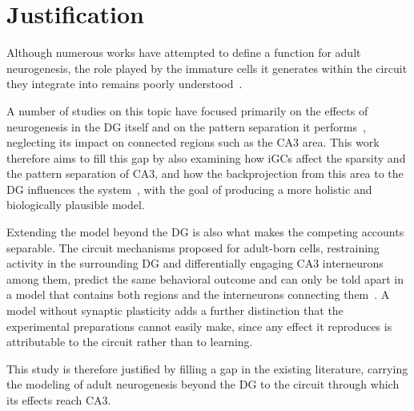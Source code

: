 \chapter{Justification}\label{cap:justification}

Although numerous works have attempted to define a function for adult neurogenesis, the role played by the immature cells it
generates within the circuit they integrate into remains poorly understood~\parencite{aimoneComputational2016, aimoneModeling2011,
berdugo-vegaSharpening2023, faresNeurogenesis2019}.

A number of studies on this topic have focused primarily on the effects of neurogenesis in the DG itself and on the pattern
separation it performs~\parencite{berdugo-vegaSharpening2023, kimAdult2024, wangEffect2024}, neglecting its impact on connected
regions such as the CA3 area. This work therefore aims to fill this gap by also examining how iGCs affect the sparsity and the
pattern separation of CA3, and how the backprojection from this area to the DG influences the
system~\parencite{myersPattern2011}, with the goal of producing a more holistic and biologically plausible model.

Extending the model beyond the DG is also what makes the competing accounts separable. The circuit mechanisms proposed for
adult-born cells, restraining activity in the surrounding DG and differentially engaging CA3 interneurons among them, predict the
same behavioral outcome and can only be told apart in a model that contains both regions and the interneurons connecting
them~\parencite{aimoneComputational2016, wangEffect2024}. A model without synaptic plasticity adds a further distinction that the
experimental preparations cannot easily make, since any effect it reproduces is attributable to the circuit rather than to
learning.

This study is therefore justified by filling a gap in the existing literature, carrying the modeling of adult neurogenesis beyond
the DG to the circuit through which its effects reach CA3.
